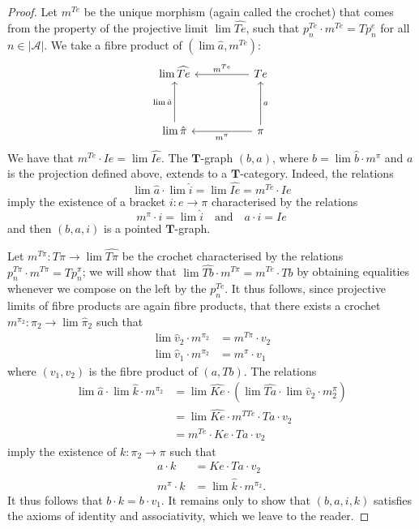 \documentclass[fleqn]{article}
\newcommand{\oldpage}[1]{\marginpar{\footnotesize$\Big\vert$ \textit{p.~#1}}}
\newcommand{\TT}{\mathbf{T}}
\newcommand{\textand}{\quad\text{and}\quad}
\newcommand{\cat}[1]{\mathcal{#1}}
\newcommand{\set}[1]{|#1|}
\begin{document}
\begin{proof}
  \oldpage{233}
  Let $m^{Te}$ be the unique morphism (again called the crochet) that comes from the property of the projective limit $\lim\widehat{Te}$, such that $p_n^{Te}\cdot m^{Te}=Tp_n^e$ for all $n\in\set{\cat{A}}$.
  We take a fibre product of $(\lim\hat{a},m^{Te})$:
  \[
    \begin{tikzcd}[sep=huge]
      \lim\widehat{Te}
    & Te
        \ar[l,swap,"m^{Te}"]
    \\\lim\hat{\pi}
        \ar[u,"\lim\hat{a}"]
    & \pi
        \ar[l,"m^\pi"]
        \ar[u,swap,"a"]
    \end{tikzcd}
  \]
  We have that $m^{Te}\cdot Ie=\lim\widehat{Ie}$.
  The $\TT$-graph $(b,a)$, where $b=\lim\hat{b}\cdot m^\pi$ and $a$ is the projection defined above, extends to a $\TT$-category.
  Indeed, the relations
  \[
    \lim\hat{a}\cdot\lim\hat{i}
    = \lim\widehat{Ie}
    = m^{Te}\cdot Ie
  \]
  imply the existence of a bracket $i\colon e\to\pi$ characterised by the relations
  \[
    m^\pi\cdot i
    = \lim\hat{i}
    \textand
    a\cdot i
    = Ie
  \]
  and then $(b,a,i)$ is a pointed $\TT$-graph.

  Let $m^{T\pi}\colon T\pi\to\lim\widehat{T\pi}$ be the crochet characterised by the relations $p_n^{T\pi}\cdot m^{T\pi}=Tp_n^\pi$;
  we will show that $\lim\widehat{Tb}\cdot m^{T\pi}=m^{Te}\cdot Tb$ by obtaining equalities whenever we compose on the left by the $p_n^{Te}$.
  It thus follows, since projective limits of fibre products are again fibre products, that there exists a crochet $m^{\pi_2}\colon\pi_2\to\lim\hat{\pi}_2$ such that
  \[
    \begin{aligned}
      \lim\hat{v}_2\cdot m^{\pi_2}
      &= m^{T\pi}\cdot v_2
    \\\lim\hat{v}_1\cdot m^{\pi_2}
      &= m^\pi\cdot v_1
    \end{aligned}
  \]
  where $(v_1,v_2)$ is the fibre product of $(a,Tb)$.
  The relations
  \[
    \begin{aligned}
      \lim\hat{a}\cdot\lim\hat{k}\cdot m^{\pi_2}
      &= \lim\widehat{Ke}\cdot(\lim\widehat{Ta}\cdot\lim\hat{v}_2\cdot m^\pi_2)
    \\&= \lim\widehat{Ke}\cdot m^{TTe}\cdot Ta\cdot v_2
    \\&= m^{Te}\cdot Ke\cdot Ta\cdot v_2
    \end{aligned}
  \]
  imply the existence of $k\colon\pi_2\to\pi$ such that
  \[
    \begin{aligned}
      a\cdot k
      &= Ke\cdot Ta\cdot v_2
    \\m^\pi\cdot k
      &= \lim\hat{k}\cdot m^{\pi_2}.
    \end{aligned}
  \]
  It thus follows that $b\cdot k=b\cdot v_1$.
  It remains only to show that $(b,a,i,k)$ satisfies the axioms of identity and associativity, which we leave to the reader.


\end{proof}
\end{document}

